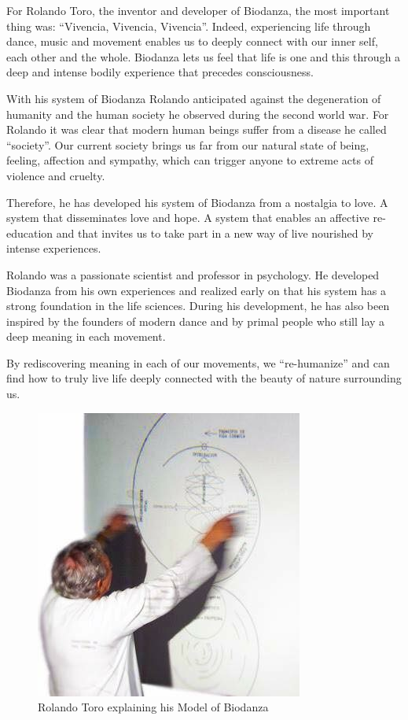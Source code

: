 \documentclass[
  11pt,
]{book}
\begin{document}
For Rolando Toro, the inventor and developer of Biodanza, the most important thing was: ``Vivencia, Vivencia, Vivencia''. Indeed, experiencing life through dance, music and movement enables us to deeply connect with our inner self, each other and the whole. Biodanza lets us feel that life is one and this through a deep and intense bodily experience that precedes consciousness.

With his system of Biodanza Rolando anticipated against the degeneration of humanity and the human society he observed during the second world war. For Rolando it was clear that modern human beings suffer from a disease he called ``society''. Our current society brings us far from our natural state of being, feeling, affection and sympathy, which can trigger anyone to extreme acts of violence and cruelty.

Therefore, he has developed his system of Biodanza from a nostalgia to love. A system that disseminates love and hope. A system that enables an affective re-education and that invites us to take part in a new way of live nourished by intense experiences.

Rolando was a passionate scientist and professor in psychology. He developed Biodanza from his own experiences and realized early on that his system has a strong foundation in the life sciences. During his development, he has also been inspired by the founders of modern dance and by primal people who still lay a deep meaning in each movement.

By rediscovering meaning in each of our movements, we ``re-humanize'' and can find how to truly live life deeply connected with the beauty of nature surrounding us.

\begin{figure}

{\centering \includegraphics[width=0.45\linewidth]{./figs/rolandoAndModel} 

}

\caption{Rolando Toro explaining his Model of Biodanza}\label{fig:rolandoModel}
\end{figure}
\end{document}
